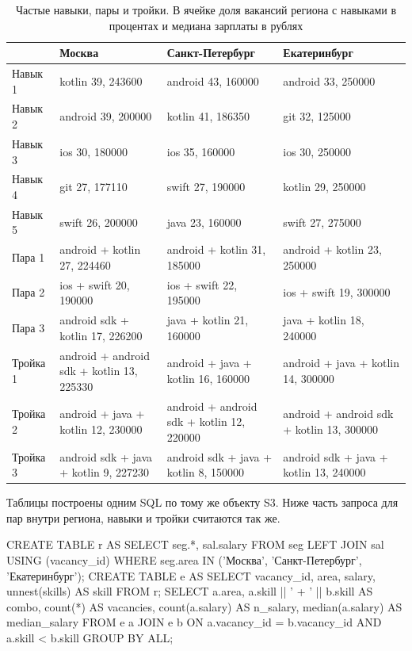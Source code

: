 \begin{table}[H]
\centering
\small
\footnotesize
\setlength{\tabcolsep}{4pt}
\begin{tabular}{|l|L{5.1cm}|L{5.1cm}|L{5.1cm}|}
\hline
 & Москва & Санкт-Петербург & Екатеринбург \\
\hline
Навык 1 & kotlin 39, 243600 & android 43, 160000 & android 33, 250000 \\
Навык 2 & android 39, 200000 & kotlin 41, 186350 & git 32, 125000 \\
Навык 3 & ios 30, 180000 & ios 35, 160000 & ios 30, 250000 \\
Навык 4 & git 27, 177110 & swift 27, 190000 & kotlin 29, 250000 \\
Навык 5 & swift 26, 200000 & java 23, 160000 & swift 27, 275000 \\
\hline
Пара 1 & android + kotlin 27, 224460 & android + kotlin 31, 185000 & android + kotlin 23, 250000 \\
Пара 2 & ios + swift 20, 190000 & ios + swift 22, 195000 & ios + swift 19, 300000 \\
Пара 3 & android sdk + kotlin 17, 226200 & java + kotlin 21, 160000 & java + kotlin 18, 240000 \\
\hline
Тройка 1 & android + android sdk + kotlin 13, 225330 & android + java + kotlin 16, 160000 & android + java + kotlin 14, 300000 \\
Тройка 2 & android + java + kotlin 12, 230000 & android + android sdk + kotlin 12, 220000 & android + android sdk + kotlin 13, 300000 \\
Тройка 3 & android sdk + java + kotlin 9, 227230 & android sdk + java + kotlin 8, 150000 & android sdk + java + kotlin 13, 240000 \\
\hline
\end{tabular}
\caption{Частые навыки, пары и тройки. В ячейке доля вакансий региона с навыками в процентах и медиана зарплаты в рублях}\label{tab:reg2}
\end{table}

Таблицы построены одним SQL по тому же объекту S3. Ниже часть запроса для
пар внутри региона, навыки и тройки считаются так же.

\begin{code}
CREATE TABLE r AS SELECT seg.*, sal.salary FROM seg LEFT JOIN sal USING (vacancy_id)
WHERE seg.area IN ('Москва', 'Санкт-Петербург', 'Екатеринбург');
CREATE TABLE e AS SELECT vacancy_id, area, salary, unnest(skills) AS skill FROM r;
SELECT a.area, a.skill || ' + ' || b.skill AS combo, count(*) AS vacancies,
       count(a.salary) AS n_salary, median(a.salary) AS median_salary
FROM e a JOIN e b ON a.vacancy_id = b.vacancy_id AND a.skill < b.skill
GROUP BY ALL;
\end{code}

